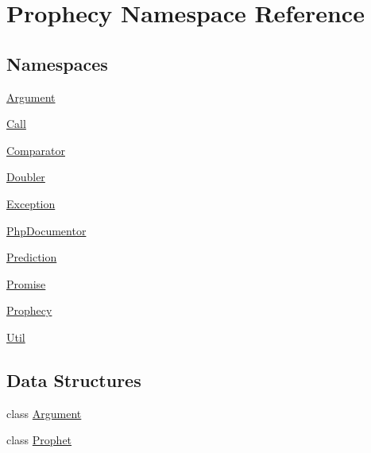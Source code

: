 \hypertarget{namespace_prophecy}{}\section{Prophecy Namespace Reference}
\label{namespace_prophecy}
\subsection*{Namespaces}
\begin{DoxyCompactItemize}
\item 
 \mbox{\hyperlink{namespace_prophecy_1_1_argument}{Argument}}
\item 
 \mbox{\hyperlink{namespace_prophecy_1_1_call}{Call}}
\item 
 \mbox{\hyperlink{namespace_prophecy_1_1_comparator}{Comparator}}
\item 
 \mbox{\hyperlink{namespace_prophecy_1_1_doubler}{Doubler}}
\item 
 \mbox{\hyperlink{namespace_prophecy_1_1_exception}{Exception}}
\item 
 \mbox{\hyperlink{namespace_prophecy_1_1_php_documentor}{Php\+Documentor}}
\item 
 \mbox{\hyperlink{namespace_prophecy_1_1_prediction}{Prediction}}
\item 
 \mbox{\hyperlink{namespace_prophecy_1_1_promise}{Promise}}
\item 
 \mbox{\hyperlink{namespace_prophecy_1_1_prophecy}{Prophecy}}
\item 
 \mbox{\hyperlink{namespace_prophecy_1_1_util}{Util}}
\end{DoxyCompactItemize}
\subsection*{Data Structures}
\begin{DoxyCompactItemize}
\item 
class \mbox{\hyperlink{class_prophecy_1_1_argument}{Argument}}
\item 
class \mbox{\hyperlink{class_prophecy_1_1_prophet}{Prophet}}
\end{DoxyCompactItemize}

